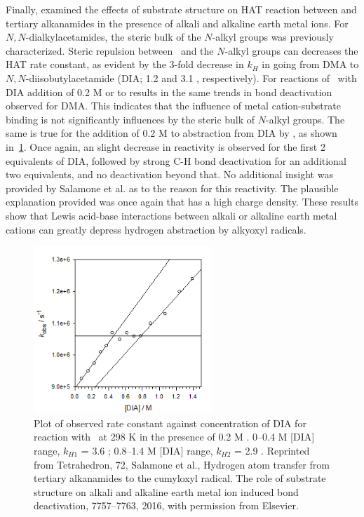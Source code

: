 Finally, \citet{Salamone2016} examined the effects of substrate structure on HAT reaction between \cumo and tertiary alkanamides in the presence of alkali and alkaline earth metal ions. For $N,N$-dialkylacetamides, the steric bulk of the $N$-alkyl groups was previously characterized.\cite{Salamone2014} Steric repulsion between \cumo\ and the $N$-alkyl groups can decreases the HAT rate constant, as evident by the 3-fold decrease in $k_H$ in going from DMA to $N,N$-diisobutylacetamide (DIA; 1.2 and 3.1 \Ms, respectively). For reactions of \cumo\ with DIA addition of 0.2 M  or  to results in the same trends in  bond deactivation observed for DMA. This indicates that the influence of metal cation-substrate binding is not significantly influences by the steric bulk of $N$-alkyl groups.  The same is true for the addition of 0.2 M  to abstraction from DIA by \cumo, as shown in~\ref{fig:k-dia-mg}. Once again, an slight decrease in reactivity is observed for the first 2 equivalents of DIA, followed by strong C-H bond deactivation for an additional two equivalents, and no deactivation beyond that. No additional insight was provided by Salamone et al. as to the reason for this reactivity. The plausible explanation provided was once again that  has a high charge density. These results show that Lewis acid-base interactions between alkali or alkaline earth metal cations can greatly depress hydrogen abstraction by alkyoxyl radicals.

\begin{figure}[!htbp]
  \includegraphics[width=0.6\textwidth]{figures/exptdia-mg.png}
  \caption[Plot of observed rate constant against concentration of DIA for reaction with \cumo\ at 298 K in the presence of 0.2 M .]
  {Plot of observed rate constant against concentration of DIA for reaction with \cumo\ at 298 K in the presence of 0.2 M . 0--0.4 M [DIA] range, $k_{H1}$ = 3.6 \Ms; 0.8--1.4 M [DIA] range, $k_{H2}$ = 2.9 \Ms.
  Reprinted from Tetrahedron, 72, Salamone et al., Hydrogen atom transfer from tertiary alkanamides to the cumyloxyl radical. The role of substrate structure on alkali and alkaline earth metal ion induced  bond deactivation, 7757--7763, 2016, with permission from Elsevier.}
  \label{fig:k-dia-mg}
\end{figure}

